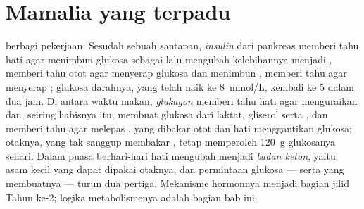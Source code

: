 \section{Mamalia yang terpadu}

\begin{proposition}\label{prop:b1:biosyntheses-integration:fedfasting}
 berbagi pekerjaan. Sesudah sebuah santapan, \emph{insulin}
dari pankreas memberi tahu hati agar menimbun glukosa sebagai 
lalu mengubah kelebihannya menjadi , memberi tahu otot agar
menyerap glukosa dan menimbun , memberi tahu  
agar menyerap ; glukosa darahnya, yang telah naik ke
\qty{8}{mmol/L}, kembali ke \qty{5}{} dalam dua jam. Di antara waktu
makan, \emph{glukagon} memberi tahu hati agar menguraikan 
dan, seiring habisnya  itu, membuat glukosa dari laktat,
gliserol serta , dan memberi tahu   agar
melepas , yang dibakar otot dan hati menggantikan glukosa;
otaknya, yang tak sanggup membakar , tetap memperoleh \qty{120}{g}
glukosanya sehari. Dalam puasa berhari-hari hati mengubah 
menjadi \emph{badan keton}, yaitu asam kecil yang dapat dipakai
otaknya, dan permintaan glukosa --- serta  yang membuatnya ---
turun dua pertiga. Mekanisme hormonnya menjadi bagian jilid Tahun
ke-2; logika metabolismenya adalah bagian bab ini.
\end{proposition}

